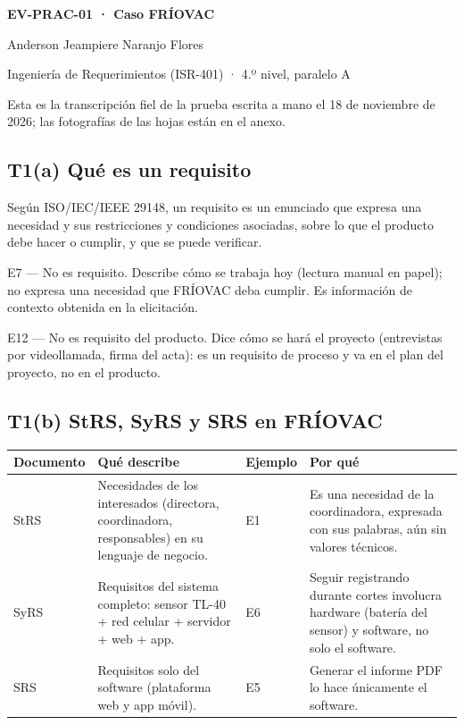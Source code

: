 \documentclass[11pt,a4paper]{article}
\newcommand{\fechaprueba}{18 de noviembre de 2026}
\begin{document}
\begin{center}
  {\Large\bfseries EV-PRAC-01 · Caso FRÍOVAC\par}
  \medskip
  Anderson Jeampiere Naranjo Flores\par
  Ingeniería de Requerimientos (ISR-401) · 4.º nivel, paralelo A
\end{center}

\noindent
Esta es la transcripción fiel de la prueba escrita a mano el
\fechaprueba{}; las fotografías de las hojas están en el anexo.

\subsection*{T1(a) Qué es un requisito}

Según ISO/IEC/IEEE 29148, un requisito es un enunciado que expresa una necesidad y sus restricciones y condiciones asociadas, sobre lo que el producto debe hacer o cumplir, y que se puede verificar.

\noindent E7 — No es requisito. Describe cómo se trabaja hoy (lectura manual en papel); no expresa una necesidad que FRÍOVAC deba cumplir. Es información de contexto obtenida en la elicitación.

\noindent E12 — No es requisito del producto. Dice cómo se hará el proyecto (entrevistas por videollamada, firma del acta): es un requisito de proceso y va en el plan del proyecto, no en el producto.

\subsection*{T1(b) StRS, SyRS y SRS en FRÍOVAC}

\begingroup
\small
\setlength{\tabcolsep}{4pt}
\renewcommand{\arraystretch}{1.2}
\begin{longtable}{@{}p{.15\linewidth}p{.33\linewidth}p{.10\linewidth}p{.35\linewidth}@{}}
\hline
\textbf{Documento} & \textbf{Qué describe} & \textbf{Ejemplo} & \textbf{Por qué} \\
\hline
\endhead
StRS & Necesidades de los interesados (directora, coordinadora, responsables) en su lenguaje de negocio. & E1 & Es una necesidad de la coordinadora, expresada con sus palabras, aún sin valores técnicos. \\
SyRS & Requisitos del sistema completo: sensor TL-40 + red celular + servidor + web + app. & E6 & Seguir registrando durante cortes involucra hardware (batería del sensor) y software, no solo el software. \\
SRS & Requisitos solo del software (plataforma web y app móvil). & E5 & Generar el informe PDF lo hace únicamente el software. \\
\hline
\end{longtable}
\endgroup
\end{document}
